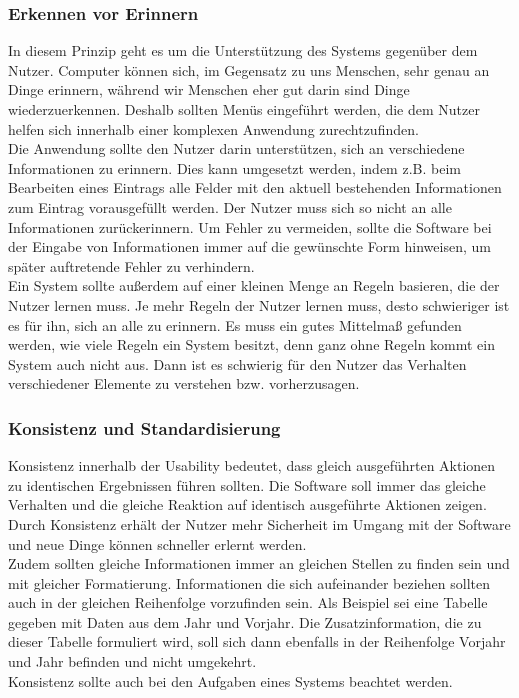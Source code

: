 \documentclass[utf8,biblatex]{lni}
\begin{document}
\subsubsection{Erkennen vor Erinnern}
In diesem Prinzip geht es um die Unterstützung des Systems gegenüber dem Nutzer. Computer können sich, im Gegensatz zu uns Menschen, sehr genau an Dinge erinnern, während wir Menschen eher gut darin sind Dinge wiederzuerkennen. Deshalb sollten Menüs eingeführt werden, die dem Nutzer helfen sich innerhalb einer komplexen Anwendung zurechtzufinden. \\
Die Anwendung sollte den Nutzer darin unterstützen, sich an verschiedene Informationen zu erinnern. Dies kann umgesetzt werden, indem z.B. beim Bearbeiten eines Eintrags alle Felder mit den aktuell bestehenden Informationen zum Eintrag vorausgefüllt werden. Der Nutzer muss sich so nicht an alle Informationen zurückerinnern. Um Fehler zu vermeiden, sollte die Software bei der Eingabe von Informationen immer auf die gewünschte Form hinweisen, um später auftretende Fehler zu verhindern.\\
Ein System sollte außerdem auf einer kleinen Menge an Regeln basieren, die der Nutzer lernen muss. Je mehr Regeln der Nutzer lernen muss, desto schwieriger ist es für ihn, sich an alle zu erinnern. Es muss ein gutes Mittelmaß gefunden werden, wie viele Regeln ein System besitzt, denn ganz ohne Regeln kommt ein System auch nicht aus. Dann ist es schwierig für den Nutzer das Verhalten verschiedener Elemente zu verstehen bzw. vorherzusagen. 


\subsubsection{Konsistenz und Standardisierung}
Konsistenz innerhalb der Usability bedeutet, dass gleich ausgeführten Aktionen zu identischen Ergebnissen führen sollten. Die Software soll immer das gleiche Verhalten und die gleiche Reaktion auf identisch ausgeführte Aktionen zeigen. Durch Konsistenz erhält der Nutzer mehr Sicherheit im Umgang mit der Software und neue Dinge können schneller erlernt werden.\\
Zudem sollten gleiche Informationen immer an gleichen Stellen zu finden sein und mit gleicher Formatierung. Informationen die sich aufeinander beziehen sollten auch in der gleichen Reihenfolge vorzufinden sein. Als Beispiel sei eine Tabelle gegeben mit Daten aus dem Jahr und Vorjahr. Die Zusatzinformation, die zu dieser Tabelle formuliert wird, soll sich dann ebenfalls in der Reihenfolge Vorjahr und Jahr befinden und nicht umgekehrt. \\
Konsistenz sollte auch bei den Aufgaben eines Systems beachtet werden.
\end{document}

